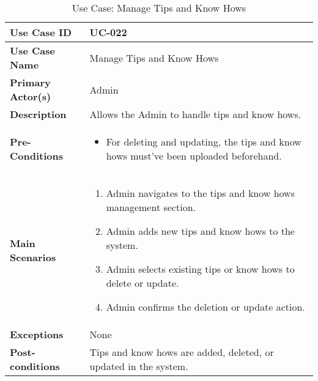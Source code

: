 \begin{table}[ht]
    \centering
    \begin{tabular}{|l|p{}|}
        \hline
        \textbf{Use Case ID} & UC-022 \\
        \hline
        \textbf{Use Case Name} & Manage Tips and Know Hows \\
        \hline
        \textbf{Primary Actor(s)} & Admin \\
        \hline
        \textbf{Description} & Allows the Admin to handle tips and know hows. \\
        \hline
        \textbf{Pre-Conditions} & 
        \begin{itemize}[itemsep=0pt]
            \item For deleting and updating, the tips and know hows must've been uploaded beforehand.
        \end{itemize} \\
        \hline
        \textbf{Main Scenarios} & 
        \begin{enumerate}[label=\arabic*.,itemsep=0pt]
            \item Admin navigates to the tips and know hows management section.
            \item Admin adds new tips and know hows to the system.
            \item Admin selects existing tips or know hows to delete or update.
            \item Admin confirms the deletion or update action.
        \end{enumerate} \\
        \hline
        \textbf{Exceptions} & None \\
        \hline
        \textbf{Post-conditions} & Tips and know hows are added, deleted, or updated in the system. \\
        \hline
    \end{tabular}
    \label{tab:use-case-manage-tips-know-hows}
    \caption{Use Case: Manage Tips and Know Hows}
\end{table}


